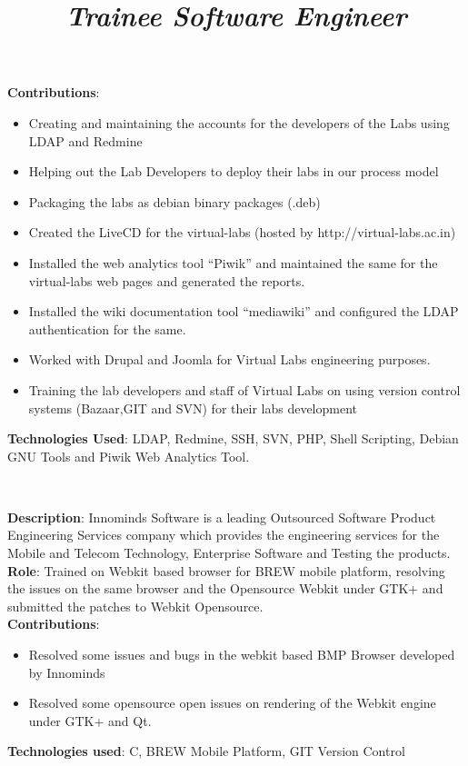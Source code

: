 \begin{resume}
\begin{position}
\textbf{Contributions}:
\begin{itemize}
\item Creating and maintaining the accounts for the developers of the
  Labs using LDAP and Redmine
\item Helping out the Lab Developers to deploy their labs in our
  process model
\item Packaging the labs as debian binary packages (.deb)
\item Created the LiveCD for the virtual-labs (hosted by
  http://virtual-labs.ac.in)
\item Installed the web analytics tool ``Piwik'' and maintained the same
  for the virtual-labs web pages and generated the reports.
\item Installed the wiki documentation tool ``mediawiki'' and
  configured the LDAP authentication for the same.
\item Worked with Drupal and Joomla for Virtual Labs engineering
  purposes.
\item Training the lab developers and staff of Virtual Labs on using
  version control systems (Bazaar,GIT and SVN) for their labs
  development

\end{itemize}
\textbf{Technologies Used}: LDAP, Redmine, SSH, SVN, PHP, Shell
Scripting, Debian GNU Tools and Piwik Web Analytics Tool.
\end{position}
\\
\title{\em \textbf{Trainee Software Engineer}}
\begin{position}
\textbf{Description}: Innominds Software is a leading Outsourced
Software Product Engineering Services company which provides the
engineering services for the Mobile and Telecom Technology, Enterprise
Software and Testing the products.\\
\textbf{Role}: Trained on Webkit based browser for BREW mobile
platform, resolving the issues on the same browser and the Opensource
Webkit under GTK+ and submitted the patches to Webkit Opensource.\\
\textbf{Contributions}: 
\begin{itemize}
\item Resolved some issues and bugs in the webkit based BMP Browser
  developed by Innominds
\item Resolved some opensource open issues on rendering of the Webkit
  engine under GTK+ and Qt.
\end{itemize}
\textbf{Technologies used}: C, BREW Mobile Platform, GIT Version
Control  
\end{position}
\\


\end{resume}
